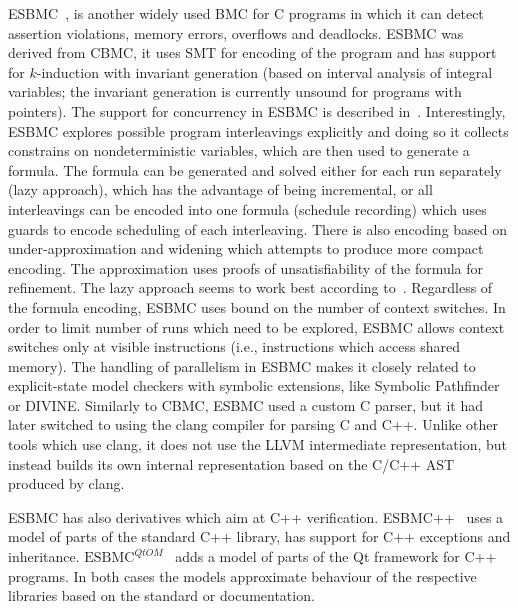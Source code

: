 
ESBMC~\cite{Gadelha2018,Gadelha2019}, is another widely used BMC for C
programs in which it can detect assertion violations, memory errors, overflows and  deadlocks.
ESBMC was derived from CBMC, it uses SMT for encoding of the program and has
support for $k$-induction with invariant generation (based on interval analysis
of integral variables; the invariant generation is currently unsound for
programs with pointers).
The support for concurrency in ESBMC is described in~\cite{Cordeiro2011}.
Interestingly, ESBMC explores possible program interleavings explicitly and
doing so it collects constrains on nondeterministic variables, which are then
used to generate a formula.
The formula can be generated and solved either for each run separately (lazy
approach), which has the advantage of being incremental, or all interleavings
can be encoded into one formula (schedule recording) which uses guards to
encode scheduling of each interleaving.
There is also encoding based on under-approximation and widening which attempts
to produce more compact encoding.
The approximation uses proofs of unsatisfiability of the formula for refinement.
The lazy approach seems to work best according to~\cite{Cordeiro2011}.
Regardless of the formula encoding, ESBMC uses bound on the number of context
switches.
In order to limit number of runs which need to be explored, ESBMC allows
context switches only at visible instructions (i.e., instructions which access
shared memory).
The handling of parallelism in ESBMC makes it closely related to explicit-state
model checkers with symbolic extensions, like Symbolic Pathfinder or DIVINE.
Similarly to CBMC, ESBMC used a custom C parser, but it had later switched to
using the clang compiler for parsing C and C++.
Unlike other tools which use clang, it does not use the LLVM intermediate
representation, but instead builds its own internal representation based on the
C/C++ AST produced by clang.

ESBMC has also derivatives which aim at C++ verification.
ESBMC++~\cite{Ramalho2013} uses a model of parts of the standard C++ library,
has support for C++ exceptions and inheritance.
$\text{ESBMC}^{\textit{Qt}OM}$~\cite{Sousa2015,Garcia2016} adds a model
of parts of the Qt framework for C++ programs.
In both cases the models approximate behaviour of the respective libraries
based on the standard or documentation.

